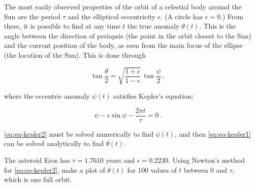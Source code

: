 \begin{exercise}
	The most easily observed properties of the orbit of a celestial body around
	the Sun are the period $\tau$ and the elliptical eccentricity $\epsilon$.
	(A circle has $\epsilon=0$.) From these, it is possible to find at any time
	$t$ the true anomaly $\theta(t)$. This is the angle between the direction
	of periapsis (the point in the orbit closest to the Sun) and the current
	position of the body, as seen from the main focus of the ellipse (the
	location of the Sun). This is done through

	\begin{equation}
		\tan \frac{\theta}{2} = \sqrt{\frac{1+\epsilon}{1-\epsilon}}\,
		\tan \frac{\psi}{2}\,,
		\label{eq:eq-kepler1}
	\end{equation}

	where the eccentric anomaly $\psi(t)$ satisfies Kepler's equation:

	\begin{equation}
		\psi - \epsilon \sin \psi - \frac{2\pi t}{\tau} = 0\,.
		\label{eq:eq-kepler2}
	\end{equation}

	\ref{eq:eq-kepler2} must be solved numerically to find $\psi(t)$, and
	then \ref{eq:eq-kepler1} can be solved analytically to find $\theta(t)$.

	The asteroid Eros has $\tau=1.7610$ years and $\epsilon=0.2230$. Using
	Newton's method for \ref{eq:eq-kepler2}, make a plot of $\theta(t)$ for 100
	values of $t$ between $0$ and $\tau$, which is one full orbit.
\end{exercise}


